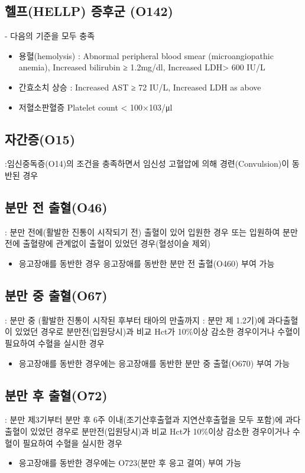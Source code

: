 \subsection*{헬프(HELLP) 증후군 (O142)}\label{HELLP}
 - 다음의 기준을 모두 충족
\begin{itemize}\tightlist
\item 용혈(hemolysis) : Abnormal peripheral blood smear (microangiopathic anemia), Increased bilirubin ≥ 1.2mg/dl, Increased LDH> 600 IU/L
\item 간효소치 상승 : Increased AST ≥ 72 IU/L, Increased LDH as above
\item 저혈소판혈증 Platelet count < 100×103/μl
\end{itemize}

\subsection*{자간증(O15)}\label{eclampsia}
 :임신중독증(O14)의 조건을 충족하면서 임신성 고혈압에 의해 경련(Convulsion)이 동반된 경우
\prezi{\clearpage}
\subsection*{분만 전 출혈(O46)}
 : 분만 전에(활발한 진통이 시작되기 전) 출혈이 있어 입원한 경우 또는 입원하여 분만 전에 출혈량에 관계없이 출혈이 있었던 경우(혈성이슬 제외)
\begin{itemize}\tightlist
\item 응고장애를 동반한 경우 응고장애를 동반한 분만 전 출혈(O460) 부여 가능
\end{itemize}

\subsection*{분만 중 출혈(O67)} : 분만 중 (활발한 진통이 시작된 후부터 태아의 만출까지 : 분만 제 1.2기)에 과다출혈이 있었던 경우로 분만전(입원당시)과 비교 Hct가 10\%이상 감소한 경우이거나 수혈이 필요하여 수혈을 실시한 경우
\begin{itemize}\tightlist
\item 응고장애를 동반한 경우에는 응고장애를 동반한 분만 중 출혈(O670) 부여 가능
\end{itemize}
\subsection*{분만 후 출혈(O72)} : 분만 제3기부터 분만 후 6주 이내(조기산후출혈과 지연산후출혈을 모두 포함)에 과다 출혈이 있었던 경우로 분만전(입원당시)과 비교 Hct가 10\%이상 감소한 경우이거나 수혈이 필요하여 수혈을 실시한 경우
\begin{itemize}\tightlist
\item 응고장애를 동반한 경우에는 O723(분만 후 응고 결여) 부여 가능
\end{itemize}
\prezi{\clearpage}
